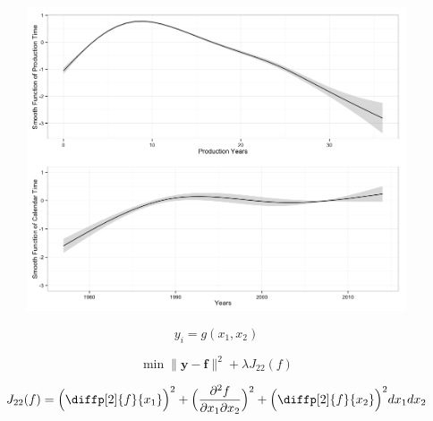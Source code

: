 \documentclass{beamer}
\begin{document}
\begin{frame}
\begin{figure}
	\includegraphics[width=1\textwidth]{figures/smooths.png}
	\label{smooths}
\end{figure}
\end{frame}




\begin{frame}
	\begin{equation}
	y_i = g(x_1, x_2)
	\label{thin_plate_1}
	\end{equation}

	\begin{equation}
\min \|\boldsymbol{y-f}\|^2 + \lambda J_{22}(f)
\label{thin_plate_2}
	\end{equation}

\end{frame}



\begin{frame}
\begin{equation}
	J_{22}(f)= \Big(  \diffp[2]{f}{x_1} \Big)^2 +
	 \Big(\frac{\partial^2 f}{\partial x_1 \partial x_2}\Big)^2 + 
	\Big(\diffp[2]{f}{x_2} \Big)^2dx_1 dx_2
\label{thin_plate_3}
	\end{equation}
\end{frame}
\end{document}
